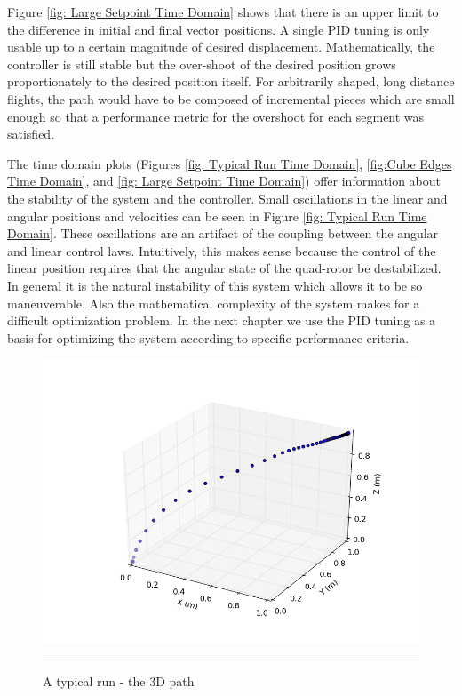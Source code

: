 Figure \ref{fig: Large Setpoint Time Domain} shows that there is an upper limit to the difference in initial and final vector positions. A single PID tuning is only usable up to a certain magnitude of desired displacement. Mathematically, the controller is still stable but the over-shoot of the desired position grows proportionately to the desired position itself. For arbitrarily shaped, long distance flights, the path would have to be composed of incremental pieces which are small enough so that a performance metric for the overshoot for each segment was satisfied.

The time domain plots (Figures     \ref{fig: Typical Run Time Domain},   \ref{fig:Cube Edges Time Domain}, and \ref{fig: Large Setpoint Time Domain}) offer information about the stability of the system and the controller. Small oscillations in the linear and angular positions and velocities can be seen in Figure \ref{fig: Typical Run Time Domain}. These oscillations are an artifact of the coupling between the angular and linear control laws. Intuitively, this makes sense because the control of the linear position requires that the angular state of the quad-rotor be destabilized. In general it is the natural instability of this system which allows it to be so maneuverable. Also the mathematical complexity of the system makes for a difficult optimization problem. In the next chapter we use the PID tuning as a basis for optimizing the system according to specific performance criteria.

\begin{figure}[htbp]
	\centering
		\includegraphics[width=\textwidth]{Figures/typical_run_time_3D_path.png}
		\rule{35em}{0.5pt}
	\caption[Typical Run 3D Path]{A typical run - the 3D path}
	\label{fig:Typical Run 3D Path}
\end{figure}

